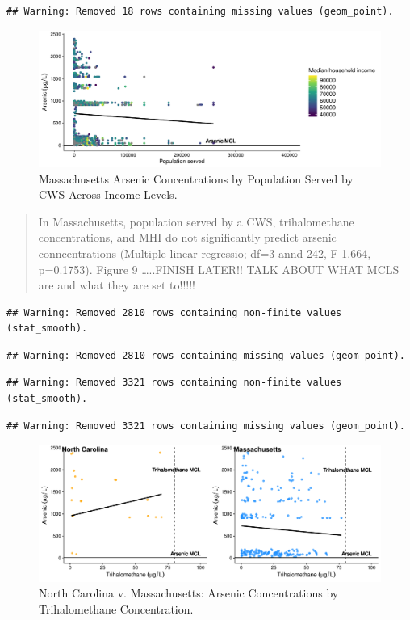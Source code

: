 \documentclass[12pt,]{article}
\begin{document}
\begin{verbatim}
## Warning: Removed 18 rows containing missing values (geom_point).
\end{verbatim}

\begin{figure}
\centering
\includegraphics{Project_Template_files/figure-latex/figs10-1.pdf}
\caption{Massachusetts Arsenic Concentrations by Population Served by
CWS Across Income Levels.}
\end{figure}

\begin{quote}
In Massachusetts, population served by a CWS, trihalomethane
concentrations, and MHI do not significantly predict arsenic
conncentrations (Multiple linear regressio; df=3 annd 242, F-1.664,
p=0.1753). Figure 9 \ldots{}..FINISH LATER!! TALK ABOUT WHAT MCLS are
and what they are set to!!!!!
\end{quote}

\begin{verbatim}
## Warning: Removed 2810 rows containing non-finite values (stat_smooth).
\end{verbatim}

\begin{verbatim}
## Warning: Removed 2810 rows containing missing values (geom_point).
\end{verbatim}

\begin{verbatim}
## Warning: Removed 3321 rows containing non-finite values (stat_smooth).
\end{verbatim}

\begin{verbatim}
## Warning: Removed 3321 rows containing missing values (geom_point).
\end{verbatim}

\begin{figure}
\centering
\includegraphics{Project_Template_files/figure-latex/figs11-1.pdf}
\caption{North Carolina v. Massachusetts: Arsenic Concentrations by
Trihalomethane Concentration.}
\end{figure}
\end{document}
